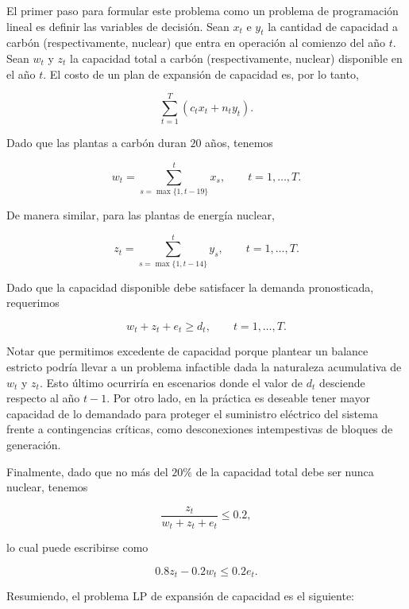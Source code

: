 El primer paso para formular este problema como un problema de programación lineal es definir las variables de decisión. Sean $x_t$ e $y_t$ la cantidad de capacidad a carbón (respectivamente, nuclear) que entra en operación al comienzo del año $t$. Sean $w_t$ y $z_t$ la capacidad total a carbón (respectivamente, nuclear) disponible en el año $t$. El costo de un plan de expansión de capacidad es, por lo tanto,

\[
\sum_{t=1}^{T} \left(c_t x_t + n_t y_t\right).
\]

Dado que las plantas a carbón duran $20$ años, tenemos

\begin{equation}
w_t = \sum_{s=\max\{1,t-19\}}^{t} x_s, \qquad t=1,\ldots,T.
\end{equation}

De manera similar, para las plantas de energía nuclear,

\begin{equation}
z_t = \sum_{s=\max\{1,t-14\}}^{t} y_s, \qquad t=1,\ldots,T.
\end{equation}

Dado que la capacidad disponible debe satisfacer la demanda pronosticada, requerimos

\begin{equation}
    w_t + z_t + e_t \ge d_t, \qquad t=1,\ldots,T.
\end{equation}

Notar que permitimos excedente de capacidad porque plantear un balance estricto podría llevar a un problema infactible dada la naturaleza acumulativa de $w_t$ y $z_t$. Esto último ocurriría en escenarios donde el valor de $d_t$ desciende respecto al año $t-1$. Por otro lado, en la práctica es deseable tener mayor capacidad de lo demandado para proteger el suministro eléctrico del sistema frente a contingencias críticas, como desconexiones intempestivas de bloques de generación.

Finalmente, dado que no más del $20\%$ de la capacidad total debe ser nunca nuclear, tenemos

\[
\frac{z_t}{w_t + z_t + e_t} \le 0.2,
\]

lo cual puede escribirse como

\begin{equation}
    0.8z_t - 0.2w_t \le 0.2e_t.
\end{equation}

Resumiendo, el problema LP de expansión de capacidad es el siguiente:

